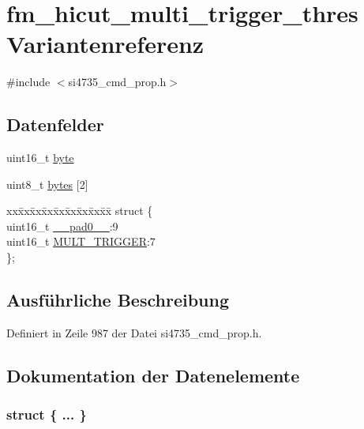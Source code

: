 \hypertarget{unionfm__hicut__multi__trigger__thres}{}\section{fm\+\_\+hicut\+\_\+multi\+\_\+trigger\+\_\+thres Variantenreferenz}
\label{unionfm__hicut__multi__trigger__thres}


{\ttfamily \#include $<$si4735\+\_\+cmd\+\_\+prop.\+h$>$}

\subsection*{Datenfelder}
\begin{DoxyCompactItemize}
\item 
uint16\+\_\+t \hyperlink{unionfm__hicut__multi__trigger__thres_ab0549c1b5ea980a02e7eab77e21fea49}{byte}
\item 
uint8\+\_\+t \hyperlink{unionfm__hicut__multi__trigger__thres_a46e4c05d20a047ec169f60d3167e912e}{bytes} \mbox{[}2\mbox{]}
\item 
\begin{tabbing}
xx\=xx\=xx\=xx\=xx\=xx\=xx\=xx\=xx\=\kill
struct \{\\
\>uint16\_t \hyperlink{unionfm__hicut__multi__trigger__thres_a77132c2c26a75f5b8751b235cda23828}{\_\_pad0\_\_}:9\\
\>uint16\_t \hyperlink{unionfm__hicut__multi__trigger__thres_ac92332e1bbf71748b389eacaab7e2501}{MULT\_TRIGGER}:7\\
\}; \\

\end{tabbing}\end{DoxyCompactItemize}


\subsection{Ausführliche Beschreibung}


Definiert in Zeile 987 der Datei si4735\+\_\+cmd\+\_\+prop.\+h.



\subsection{Dokumentation der Datenelemente}
\hypertarget{unionfm__hicut__multi__trigger__thres_ae582d468df211db35528a347c5f5a569}{}\subsubsection[{"@121}]{\setlength{\rightskip}{0pt plus 5cm}struct \{ ... \} }\label{unionfm__hicut__multi__trigger__thres_ae582d468df211db35528a347c5f5a569}
\hypertarget{unionfm__hicut__multi__trigger__thres_a77132c2c26a75f5b8751b235cda23828}{}
